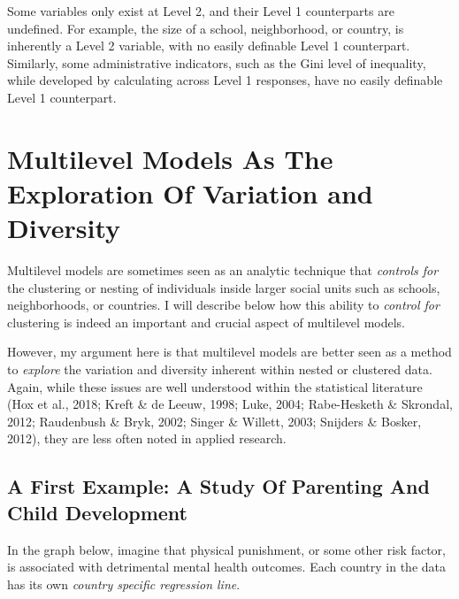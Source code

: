 \documentclass[
  letterpaper,
  DIV=11,
  numbers=noendperiod]{scrreprt}
\begin{document}
Some variables only exist at Level 2, and their Level 1 counterparts are
undefined. For example, the size of a school, neighborhood, or country,
is inherently a Level 2 variable, with no easily definable Level 1
counterpart. Similarly, some administrative indicators, such as the Gini
level of inequality, while developed by calculating across Level 1
responses, have no easily definable Level 1 counterpart.

\section{Multilevel Models As The Exploration Of Variation and
Diversity}\label{sec-studyvariation}

Multilevel models are sometimes seen as an analytic technique that
\emph{controls for} the clustering or nesting of individuals inside
larger social units such as schools, neighborhoods, or countries. I will
describe below how this ability to \emph{control for} clustering is
indeed an important and crucial aspect of multilevel models.

However, my argument here is that multilevel models are better seen as a
method to \emph{explore} the variation and diversity inherent within
nested or clustered data. Again, while these issues are well understood
within the statistical literature (Hox et al., 2018; Kreft \& de Leeuw,
1998; Luke, 2004; Rabe-Hesketh \& Skrondal, 2012; Raudenbush \& Bryk,
2002; Singer \& Willett, 2003; Snijders \& Bosker, 2012), they are less
often noted in applied research.

\subsection{A First Example: A Study Of Parenting And Child
Development}\label{a-first-example-a-study-of-parenting-and-child-development}

In the graph below, imagine that physical punishment, or some other risk
factor, is associated with detrimental mental health outcomes. Each
country in the data has its own \emph{country specific regression line}.
\end{document}
